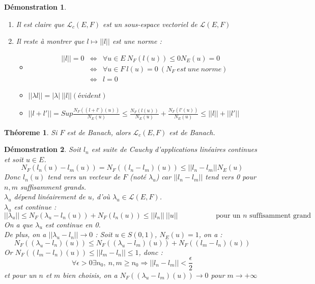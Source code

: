 \documentclass[a4paper, oneside]{report}
\theoremstyle{break}
\newtheorem{thm}{Théoreme}[section] %
\newtheorem*{demo}{Démonstration}
\renewcommand{\L}{\mathcal{L}}
\newcommand{\sev}{sous-espace vectoriel }
\newcommand{\aplins}{applications linéaires }
\begin{document}
\begin{demo}
\begin{enumerate}
\item Il est claire que $\L_c(E,F)$ est un \sev de $\L(E,F)$
\item Il reste à montrer que $l\mapsto ||l||$ est une norme :
\begin{itemize}
\item $$
\begin{array}{lll}
||l||=0 &\Leftrightarrow & \forall u\in E~N_F(l(u))\leq 0 N_E(u)=0\\
&\Leftrightarrow& \forall u\in F~l(u)=0~(N_F~est~une~norme)\\
&\Leftrightarrow& l=0
\end{array}$$

\item $||\lambda l||=|\lambda|~||l|| (évident)$

\item $||l+l'||=Sup \frac{N_F((l+l')(u))}{N_E(u)} \leq \frac{N_F(l(u))}{N_E(u)} + \frac{N_F(l'(u))}{N_E(u)} \leq ||l||+||l'||$
\end{itemize}
\end{enumerate}
\end{demo}

\begin{thm}
Si $F$ est de Banach, alors $\L_c(E,F)$ est de Banach.
\end{thm}

\begin{demo}
Soit $l_n$ est suite de Cauchy d'\aplins continues et soit $u\in E$.
$$N_F(l_n(u)-l_m(u))=N_F((l_n-l_m)(u))\leq ||l_n-l_m||N_E(u)$$
Donc $l_n(u)$ tend vers un vecteur de $F$ (noté $\lambda_u$) car $||l_n-l_m||$ tend vers 0 pour $n,m$ suffisamment grands.\\
$\lambda_u$ dépend linéairement de $u$, d'où $\lambda_u\in \L(E,F)$.\\
$\lambda_u$ est continue :
$$||\lambda_u||\leq N_F(\lambda_u-l_n(u))+N_F(l_n(u))\leq ||l_n||~||u||\hspace{5em}\text{ pour un }n\text{ suffisamment grand}$$
On a que $\lambda_u$ est continue en 0.\\
De plus, on a  $||\lambda_u - l_n||\rightarrow 0$ :
Soit $u\in S(0,1)$, $N_E(u)=1$, on a :
$$N_F((\lambda_u-l_n)(u))\leq N_F((\lambda_u-l_m)(u))+N_F((l_m-l_n)(u))$$
Or $N_F((l_m-l_n)(u)) \leq ||l_m-l_n|| \leq 1$, donc :
$$\forall \epsilon>0 \exists n_0,~n,m\geq n_0 \Rightarrow ||l_n-l_m||<\frac{\epsilon}{2}$$
et pour un $n$ et $m$ bien choisis, on a $N_F((\lambda_u-l_m)(u)) \rightarrow 0$ pour $m\rightarrow +\infty$
\end{demo}
\end{document}
